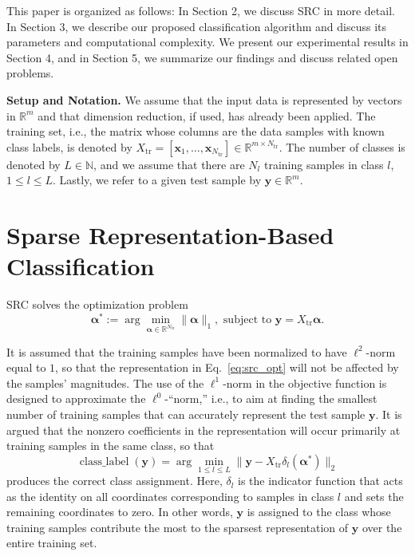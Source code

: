 \documentclass[review]{elsarticle}
\newcommand{\classlabel}{\operatorname{class\_label}}
\begin{document}
This paper is organized as follows: In Section 2, we discuss SRC in more detail. In Section 3, we describe our proposed classification algorithm and discuss its parameters and computational complexity. We present our experimental results in Section 4, and in Section 5, we summarize our findings and discuss related open problems. 



\textbf{Setup and Notation.} We assume that the input data is represented by vectors in $\mathbb{R}^m$ and that dimension reduction, if used, has already been applied. The training set, i.e., the matrix whose columns are the data samples with known class labels, is denoted by $X_\mathrm{tr} = [\bm{x}_1,\ldots,\bm{x}_{N_\mathrm{tr}}] \in \mathbb{R}^{m\times N_{\mathrm{tr}}}$. The number of classes is denoted by $L \in \mathbb{N}$, and we assume that there are $N_l$ training samples in class $l$, $1\leq l \leq L$. Lastly, we refer to a given test sample by $\bm{y} \in \mathbb{R}^m$. 



\section{Sparse Representation-Based Classification}


SRC \cite{wri:src} solves the optimization problem
\begin{equation}\label{eq:src_opt}
\bm{\alpha}^* := \arg \min_{\bm{\alpha}\in \mathbb{R}^{N_\mathrm{tr}}} \|\bm{\alpha}\|_1, \text{ subject to } \bm{y} = X_\mathrm{tr} \bm{\alpha}.
\end{equation}

It is assumed that the training samples have been normalized to have $\ell^2$-norm equal to $1$, so that the representation in Eq.~\eqref{eq:src_opt} will not be affected by the samples' magnitudes. The use of the $\ell^1$-norm in the objective function is designed to approximate the $\ell^0$-``norm,'' i.e., to aim at finding the smallest number of training samples that can accurately represent the test sample $\bm{y}$. It is argued that the nonzero coefficients in the representation will occur primarily at training samples in the same class, so that
\begin{equation} \label{eq:src_class}
\classlabel(\bm{y}) = \arg \min_{1\leq l \leq L} \big\|\bm{y} - X_\mathrm{tr}\delta_l(\bm{\alpha}^*)\big\|_2
\end{equation}
produces the correct class assignment. Here, $\delta_l$ is the indicator function that acts as the identity on all coordinates corresponding to samples in class $l$ and sets the remaining coordinates to zero. In other words, $\bm{y}$ is assigned to the class whose training samples contribute the most to the sparsest representation of $\bm{y}$ over the entire training set.
\end{document}

